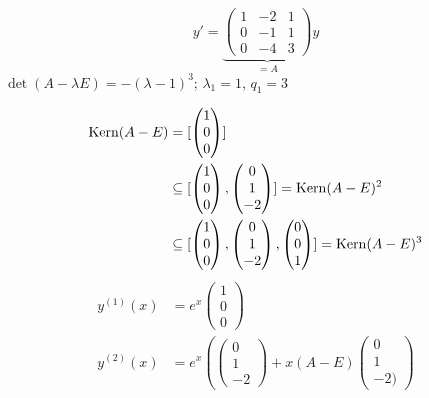 \documentclass[a4paper,twoside,DIV15,BCOR12mm]{scrbook}
\begin{document}
\begin{beispiele}
\item

\[y' = \underbrace{
\begin{pmatrix}
1  & -2 & 1 \\
0 & -1 & 1 \\
0 & -4 & 3 
\end{pmatrix}}_{=A}y
\]
$\det(A-\lambda E) = -(\lambda-1)^3$; $\lambda_1 = 1$, $q_1=3$

\begin{align*}
\mathop{\mathrm{Kern}}\nolimits(A-E) &= [
\begin{pmatrix}
1\\0\\0
\end{pmatrix}]\\
&\subseteq [
\begin{pmatrix}
1\\0\\0
\end{pmatrix},
\begin{pmatrix}
0\\1\\-2
\end{pmatrix}] = \mathop{\mathrm{Kern}}\nolimits(A-E)^2\\
&\subseteq [
\begin{pmatrix}
1\\0\\0
\end{pmatrix},
\begin{pmatrix}
0\\1\\-2
\end{pmatrix},
\begin{pmatrix}
0\\0\\1
\end{pmatrix}
] = \mathop{\mathrm{Kern}}\nolimits(A-E)^3
\end{align*}
\begin{align*}
y^{(1)}(x) &= e^x
\begin{pmatrix}
1\\0\\0
\end{pmatrix}\\
y^{(2)}(x) &= e^x \left(
\begin{pmatrix}
0\\1\\-2
\end{pmatrix} + x(A-E)
\begin{pmatrix}
0\\1\\-2)

\end{pmatrix}
\end{align*}
\end{beispiele}
\end{document}
